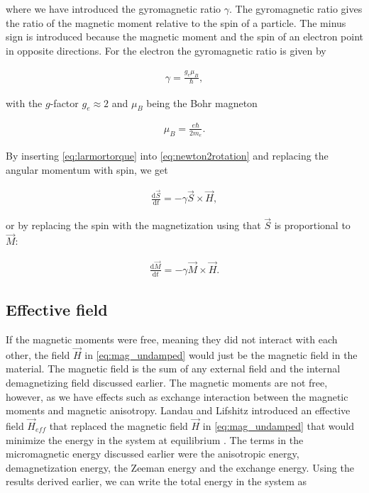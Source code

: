 \documentclass[1p]{elsarticle}		%
\numberwithin{equation}{section}
\begin{document}
where we have introduced the gyromagnetic ratio $\gamma$. The gyromagnetic ratio gives the ratio of the magnetic moment relative to the spin of a particle. The minus sign is introduced because the magnetic moment and the spin of an electron point in opposite directions. For the electron the gyromagnetic ratio is given by

\begin{align}
\gamma = \frac{g_e\mu_B}{\hbar},
\end{align}

with the $g$-factor $g_e \approx 2$ and $\mu_B$ being the Bohr magneton

\begin{align}
\mu_B = \frac{e\hbar}{2m_e}.
\end{align}

By inserting \eqref{eq:larmortorque} into \eqref{eq:newton2rotation} and replacing the angular momentum with spin, we get

\begin{align}
\frac{\textrm{d} \vec{S}}{\textrm{d} t} =- \gamma \vec{S} \times \vec{H},
\end{align}

or by replacing the spin with the magnetization using that $\vec{S}$ is proportional to $\vec{M}$:

\begin{align}
\label{eq:mag_undamped}
\frac{\textrm{d} \vec{M}}{\textrm{d} t} = -\gamma \vec{M} \times \vec{H}.
\end{align}

\subsection{Effective field}

If the magnetic moments were free, meaning they did not interact with each other, the field $\vec{H}$ in \eqref{eq:mag_undamped} would just be the magnetic field in the material. The magnetic field is the sum of any external field and the internal demagnetizing field discussed earlier. The magnetic moments are not free, however, as we have effects such as exchange interaction between the magnetic moments and magnetic anisotropy. Landau and Lifshitz introduced an effective field $\vec{H}_{eff}$ that replaced the magnetic field $\vec{H}$ in \eqref{eq:mag_undamped} that would minimize the energy in the system at equilibrium \cite{LandauLifshitz1935}. The terms in the micromagnetic energy discussed earlier were the anisotropic energy, demagnetization energy, the Zeeman energy and the exchange energy. Using the results derived earlier, we can write the total energy in the system as
\end{document}
